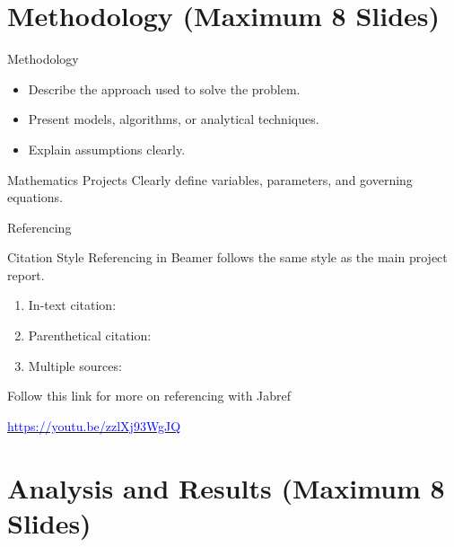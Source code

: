 \documentclass[aspectratio=169,12pt]{beamer}
\newcommand{\bcol}[2][blue]{\textcolor{#1}{#2}}
\begin{document}
	\section{Methodology  (Maximum 8 Slides)}
	
	\begin{frame}{Methodology}
		\begin{itemize}
			\item Describe the approach used to solve the problem. \pause
			\item Present models, algorithms, or analytical techniques.  \pause
			\item Explain assumptions clearly.
		\end{itemize}
		
		\begin{exampleblock}{Mathematics Projects}
			Clearly define variables, parameters, and governing equations.
		\end{exampleblock}
	\end{frame}
	
	\begin{frame}{Referencing}
		\begin{block}{Citation Style}
			Referencing in Beamer follows the same style as the main project report.
		\end{block}
		
		\begin{enumerate}
			\item In-text citation: \cite{Fosu2020}
			\item Parenthetical citation: \citep{Appati2015}
			\item Multiple sources: \citep{Fosu2021,Appati2015}
		\end{enumerate}
		
\vspace{1cm}

		Follow this link for more on referencing with Jabref
\begin{center}
\href{https://youtu.be/zzlXj93WgJQ}{\bcol{https://youtu.be/zzlXj93WgJQ}}

\end{center}
		
	\end{frame}
	
	\section{Analysis and Results  (Maximum 8 Slides)}
	
\end{document}
